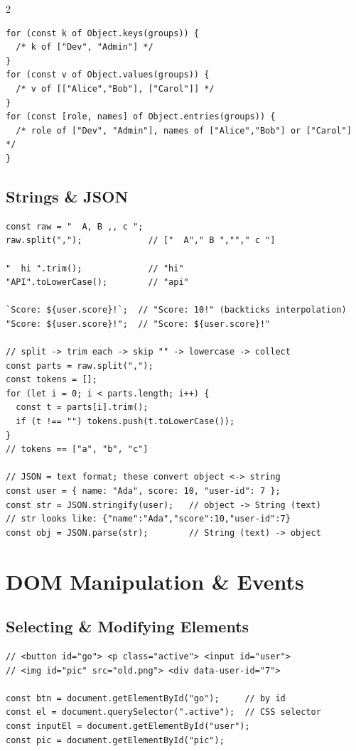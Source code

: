 \documentclass{article}
\begin{document}
\begin{multicols}{2}
\begin{lstlisting}[style=jsexam]
for (const k of Object.keys(groups)) { 
  /* k of ["Dev", "Admin"] */
}
for (const v of Object.values(groups)) {
  /* v of [["Alice","Bob"], ["Carol"]] */
}
for (const [role, names] of Object.entries(groups)) {
  /* role of ["Dev", "Admin"], names of ["Alice","Bob"] or ["Carol"] */
}
\end{lstlisting}

\columnbreak

\subsection{Strings \& JSON}
\begin{lstlisting}[style=jsexam]
const raw = "  A, B ,, c "; 
raw.split(",");             // ["  A"," B ",""," c "]

"  hi ".trim();             // "hi"
"API".toLowerCase();        // "api"

`Score: ${user.score}!`;  // "Score: 10!" (backticks interpolation)
"Score: ${user.score}!";  // "Score: ${user.score}!"

// split -> trim each -> skip "" -> lowercase -> collect
const parts = raw.split(",");
const tokens = [];
for (let i = 0; i < parts.length; i++) {
  const t = parts[i].trim(); 
  if (t !== "") tokens.push(t.toLowerCase());
}
// tokens == ["a", "b", "c"]

// JSON = text format; these convert object <-> string
const user = { name: "Ada", score: 10, "user-id": 7 };
const str = JSON.stringify(user);   // object -> String (text)
// str looks like: {"name":"Ada","score":10,"user-id":7}
const obj = JSON.parse(str);        // String (text) -> object
\end{lstlisting}




\section{DOM Manipulation \& Events}

\subsection{Selecting \& Modifying Elements}
\begin{lstlisting}[style=jsexam]
// <button id="go"> <p class="active"> <input id="user">
// <img id="pic" src="old.png"> <div data-user-id="7">

const btn = document.getElementById("go");     // by id
const el = document.querySelector(".active");  // CSS selector
const inputEl = document.getElementById("user");
const pic = document.getElementById("pic");


\end{lstlisting}
\end{multicols}
\end{document}
